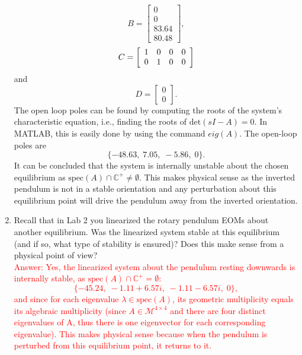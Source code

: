 \documentclass[12pt]{report}
\newcommand\drew[1]{\textcolor{red}{#1}}
\begin{document}
\begin{enumerate}
{\[              \]
              \[
                  B =
                  \left[\begin{array}{c}
                          0     \\
                          0     \\
                          83.64 \\
                          80.48
                      \end{array}\right],
              \]
              \[
                  C =
                  \left[\begin{array}{c c c c}
                          1 & 0 & 0 & 0 \\
                          0 & 1 & 0 & 0
                      \end{array}\right]
              \]
              and
              \[
                  D =
                  \left[\begin{array}{c}
                          0 \\
                          0
                      \end{array}\right].
              \]
              The open loop poles can be found by computing the roots of the system's characteristic equation, i.e., finding the roots of $\text{det}(sI-A)=0$. In MATLAB, this is easily done by using the command $eig(A)$. The open-loop poles are
              \[
                  \{-48.63, \; 7.05, \; -5.86, \; 0\}.
              \]
              It can be concluded that the system is internally unstable about the chosen equilibrium as $\text{spec}(A) \cap \mathbb{C}^+ \not = \emptyset $. This makes physical sense as the inverted pendulum is not in a stable orientation and any perturbation about this equilibrium point will drive the pendulum away from the inverted orientation.
          }
    \item Recall that in Lab 2 you linearized the rotary pendulum EOMs about another equilibrium. Was the linearized system stable at this equilibrium (and if so, what type of stability is ensured)? Does this make sense from a physical point of view?\\
          \drew{Answer: Yes, the linearized system about the pendulum resting downwards is internally stable, as $\text{spec}(A) \cap \mathbb{C}^+ = \emptyset $:
              \[
                  \{-45.24, \; -1.11 + 6.57i, \; -1.11 - 6.57i, \; 0\},
              \]
              and since for each eigenvalue $ \lambda \in \text{spec}(A)$, its geometric multiplicity equals its algebraic multiplicity (since $A \in \mathcal{M}^{4\times4}$ and there are four distinct eigenvalues of A, thus there is one eigenvector for each corresponding eigenvalue). This makes physical sense because when the pendulum is perturbed from this equilibrium point, it returns to it.
}
\end{enumerate}
\end{document}
